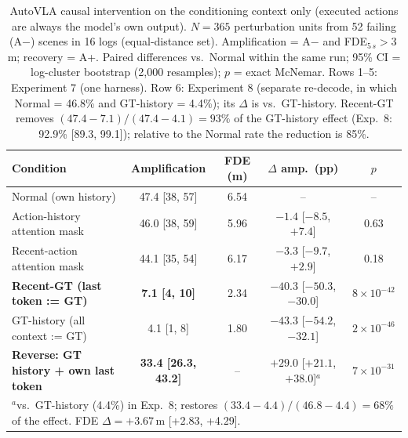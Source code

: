 \begin{table}[t]
\centering
\small
\setlength{\tabcolsep}{3.5pt}
\caption{AutoVLA causal intervention on the conditioning context only (executed actions are always the model's own output). $N=365$ perturbation units from 52 failing (A$-$) scenes in 16 logs (equal-distance set). Amplification = A$-$ and FDE$_{5\,s}>3$\,m; recovery = A+. Paired differences vs.\ Normal within the same run; 95\% CI = log-cluster bootstrap (2{,}000 resamples); $p$ = exact McNemar. Rows 1--5: Experiment 7 (one harness). Row 6: Experiment 8 (separate re-decode, in which Normal = 46.8\% and GT-history = 4.4\%); its $\Delta$ is vs.\ GT-history. Recent-GT removes $(47.4-7.1)/(47.4-4.1)=93\%$ of the GT-history effect (Exp.~8: 92.9\% [89.3, 99.1]); relative to the Normal rate the reduction is 85\%.}
\label{tab:autovla_causal}
\begin{tabular}{lcccc}
\toprule
Condition & Amplification & FDE (m) & $\Delta$ amp.\ (pp) & $p$ \\
\midrule
Normal (own history) & 47.4 [38, 57] & 6.54 & -- & -- \\
Action-history attention mask & 46.0 [38, 59] & 5.96 & $-1.4$ [$-8.5$, $+7.4$] & 0.63 \\
Recent-action attention mask & 44.1 [35, 54] & 6.17 & $-3.3$ [$-9.7$, $+2.9$] & 0.18 \\
\textbf{Recent-GT (last token := GT)} & \textbf{7.1 [4, 10]} & 2.34 & $\mathbf{-40.3}$ [$-50.3$, $-30.0$] & $8\times10^{-42}$ \\
GT-history (all context := GT) & 4.1 [1, 8] & 1.80 & $-43.3$ [$-54.2$, $-32.1$] & $2\times10^{-46}$ \\
\midrule
\textbf{Reverse: GT history + own last token} & \textbf{33.4 [26.3, 43.2]} & -- & $\mathbf{+29.0}$ [$+21.1$, $+38.0$]$^{a}$ & $7\times10^{-31}$ \\
\bottomrule
\multicolumn{5}{l}{\footnotesize $^{a}$vs.\ GT-history (4.4\%) in Exp.~8; restores $(33.4-4.4)/(46.8-4.4)=68\%$ of the effect. FDE $\Delta=+3.67$\,m [+2.83, +4.29].}
\end{tabular}
\end{table}

